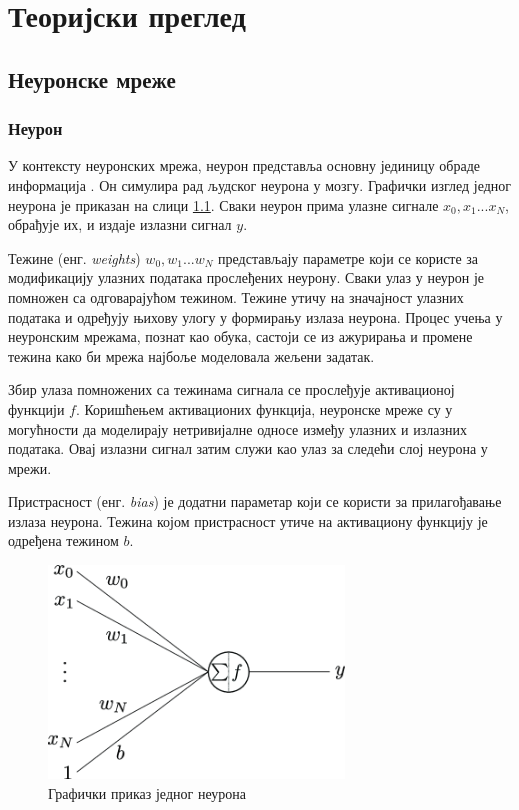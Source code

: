 \chapter{Теоријски преглед}
\label{sec:2}

\section{Неуронске мреже}
\label{sec:2.1}

\subsection{Неурон}
\label{sec:2.1.1}

У контексту неуронских мрежа, неурон представља основну јединицу обраде информација \cite{noauthor_artificial_20233}. 
Он симулира рад људског неурона у мозгу. Графички изглед једног неурона је приказан на слици \ref{fig:neuron}. 
Сваки неурон прима улазне сигнале $x_0, x_1 ... x_N$, обрађује их, и издаје излазни сигнал $y$.
\newline

Тежине (енг. \textit{weights}) $w_0, w_1 ... w_N$ представљају параметре који се користе за модификацију улазних података прослеђених неурону. 
Сваки улаз у неурон је помножен са одговарајућом тежином. Тежине утичу на значајност улазних података и одређују њихову улогу у формирању излаза неурона. 
Процес учења у неуронским мрежама, познат као обука, састоји се из ажурирања и промене тежина како би мрежа најбоље моделовала жељени задатак.
\newline

Збир улаза помножених са тежинама сигнала се прослеђује активационој функцији $f$. 
Коришћењем активационих функција, неуронске мреже су у могућности да моделирају нетривијалне односе између улазних и излазних података. 
Овај излазни сигнал затим служи као улаз за следећи слој неурона у мрежи.
\newline

Пристрасност (енг. \textit{bias}) је додатни параметар који се користи за прилагођавање излаза неурона. 
Тежина којом пристрасност утиче на активациону функцију је одређена тежином $b$.
\newline

\begin{figure}[h]
    \centering
    \includegraphics[width=0.7\textwidth]{images/neuron.png}
    \caption{Графички приказ једног неурона \cite{ioannou_structural_2017}}
    \label{fig:neuron}
\end{figure}

